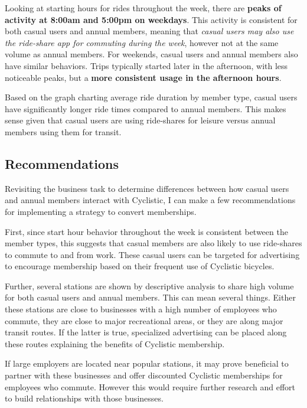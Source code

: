\documentclass[
]{article}
\begin{document}
Looking at starting hours for rides throughout the week, there are
\textbf{peaks of activity at 8:00am and 5:00pm on weekdays}. This
activity is consistent for both casual users and annual members, meaning
that \emph{casual users may also use the ride-share app for commuting
during the week}, however not at the same volume as annual members. For
weekends, casual users and annual members also have similar behaviors.
Trips typically started later in the afternoon, with less noticeable
peaks, but a \textbf{more consistent usage in the afternoon hours}.

Based on the graph charting average ride duration by member type, casual
users have significantly longer ride times compared to annual members.
This makes sense given that casual users are using ride-shares for
leisure versus annual members using them for transit.

\hypertarget{recommendations}{%
\subsection{Recommendations}\label{recommendations}}

Revisiting the business task to determine differences between how casual
users and annual members interact with Cyclistic, I can make a few
recommendations for implementing a strategy to convert memberships.

First, since start hour behavior throughout the week is consistent
between the member types, this suggests that casual members are also
likely to use ride-shares to commute to and from work. These casual
users can be targeted for advertising to encourage membership based on
their frequent use of Cyclistic bicycles.

Further, several stations are shown by descriptive analysis to share
high volume for both casual users and annual members. This can mean
several things. Either these stations are close to businesses with a
high number of employees who commute, they are close to major
recreational areas, or they are along major transit routes. If the
latter is true, specialized advertising can be placed along these routes
explaining the benefits of Cyclistic membership.

If large employers are located near popular stations, it may prove
beneficial to partner with these businesses and offer discounted
Cyclistic memberships for employees who commute. However this would
require further research and effort to build relationships with those
businesses.
\end{document}
